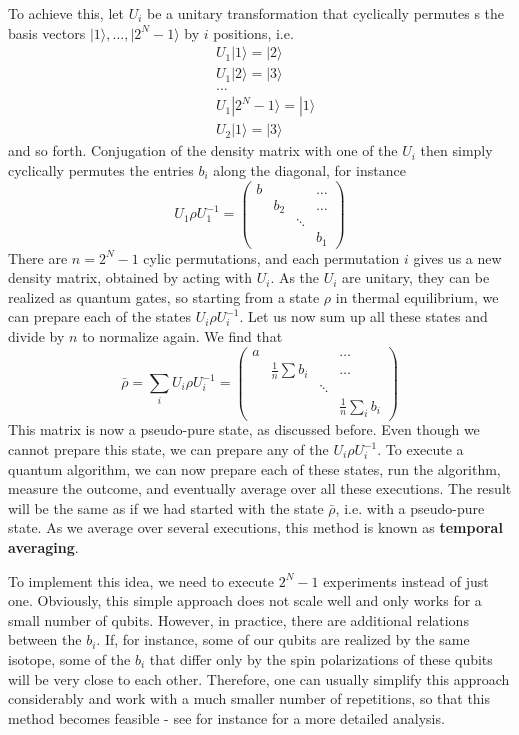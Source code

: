 \documentclass[a4paper, draft]{article}
\theoremstyle{own}
\theoremstyle{remark}
\begin{document}
To achieve this, let $U_i$ be a unitary transformation that cyclically permutes s the basis vectors $|1 \rangle, \dots, |2^N - 1 \rangle$ by $i$ positions, i.e.
\begin{align*}
&U_1 |1 \rangle = |2 \rangle  \\
&U_1 |2 \rangle = |3 \rangle \\
& \dots \\
&U_1 |2^N - 1 \rangle = |1 \rangle \\
&U_2 |1 \rangle = |3 \rangle  
\end{align*}
and so forth. Conjugation of the density matrix with one of the $U_i$ then simply cyclically permutes the entries $b_i$ along the diagonal, for instance
$$
U_1 \rho U_1^{-1} = \begin{pmatrix}
b & &  &\dots  \\
& b_2 & & \dots \\
& & \ddots & \\
& &  & b_1 
\end{pmatrix} 
$$
There are $n = 2^N - 1$ cylic permutations, and each permutation $i$ gives us a new density matrix, obtained by acting with $U_i$. As the $U_i$ are unitary, they can be realized as quantum gates, so starting from a state $\rho$ in thermal equilibrium, we can prepare each of the states $U_i \rho U_i^{-1}$. Let us now sum up all these states and divide by $n$ to normalize again. We find that
$$
\bar{\rho} = \sum_i U_i \rho U_i^{-1} = 
\begin{pmatrix}
a & &  &\dots  \\
& \frac{1}{n} \sum  b_i & & \dots \\
& & \ddots & \\
& &  & \frac{1}{n} \sum_i b_i
\end{pmatrix}
$$
This matrix is now a pseudo-pure state, as discussed before. Even though we cannot prepare this state, we can prepare any of the $U_i \rho U_i^{-1}$. To execute a quantum algorithm, we can now prepare each of these states, run the algorithm, measure the outcome, and eventually average over all these executions. The result will be the same as if we had started with the state $\bar{\rho}$, i.e. with a pseudo-pure state. As we average over several executions, this method is known as {\bf temporal averaging}. 

To implement this idea, we need to execute $2^N - 1$ experiments instead of just one. Obviously, this simple approach does not scale well and only works for a small number of qubits. However, in practice, there are additional relations between the $b_i$. If, for instance, some of our qubits are realized by the same isotope, some of the $b_i$ that differ only by the spin polarizations of these qubits will be very close to each other. Therefore, one can usually simplify this approach considerably and work with a much smaller number of repetitions, so that this method becomes feasible - see for instance \cite{KnillChuangLaflamme} for a more detailed analysis.
\end{document}
